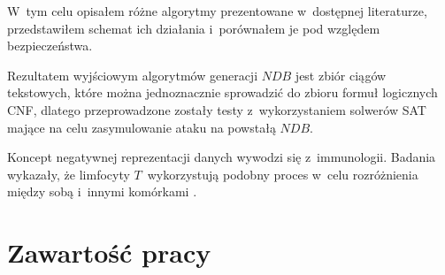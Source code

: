 W~tym celu opisałem różne algorytmy prezentowane w~dostępnej literaturze, przedstawiłem schemat ich działania i~porównałem
je pod względem bezpieczeństwa. 

Rezultatem wyjściowym algorytmów generacji $NDB$ jest zbiór ciągów tekstowych, które można jednoznacznie sprowadzić 
do zbioru formuł logicznych CNF, dlatego przeprowadzone zostały testy z~wykorzystaniem solwerów SAT mające na celu 
zasymulowanie ataku na powstałą $NDB$.

Koncept negatywnej reprezentacji danych wywodzi się z~immunologii. Badania wykazały, że limfocyty $T$~wykorzystują
podobny proces w~celu rozróżnienia między sobą i~innymi komórkami \cite{T-cells}.

\section{Zawartość pracy}

















